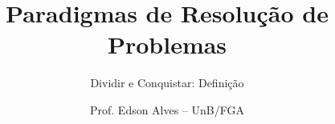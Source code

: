 \title{Paradigmas de Resolução de Problemas}
\subtitle{Dividir e Conquistar: Definição}
\author{Prof. Edson Alves -- UnB/FGA}
\date{}
